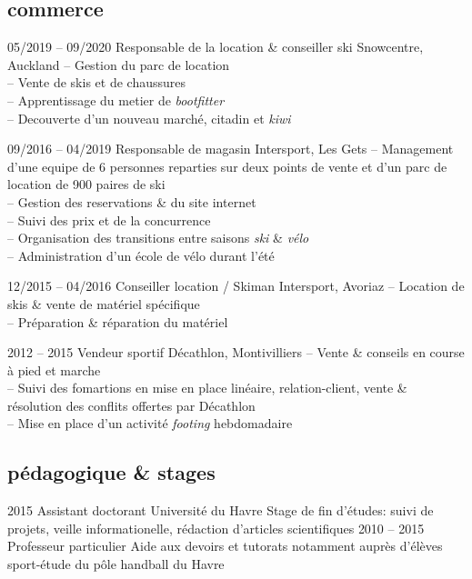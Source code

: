 \documentclass[]{farangoth-cv}
\begin{document}
\subsection{commerce}
\begin{entrylist}
  \entry%
  {05/2019 \--- 09/2020}
  {Responsable de la location \& conseiller ski}
  {Snowcentre, \mbox{Auckland}}
  {
    \--- Gestion du parc de location\\
    \--- Vente de skis et de chaussures\\
    \--- Apprentissage du metier de \emph{bootfitter}\\
    \--- Decouverte d'un nouveau marché, citadin et \emph{kiwi}
  }
  
  \entry%
  {09/2016 \--- 04/2019}
  {Responsable de magasin}
  {Intersport, Les Gets}
  {
    \--- Management d'une equipe de 6 personnes reparties sur deux points de vente et d'un parc de location de 900 paires de ski\\
    \--- Gestion des reservations \& du site internet\\
    \--- Suivi des prix et de la concurrence\\
    \--- Organisation des transitions entre saisons \emph{ski} \& \emph{vélo}\\
    \--- Administration d'un école de vélo durant l'été
  }
  
  \entry%
  {12/2015 \--- 04/2016}
  {Conseiller location / Skiman}
  {Intersport, Avoriaz}
  {%
    \--- Location de skis \& vente de matériel spécifique\\
    \--- Préparation \& réparation du matériel
  }
  
  \entry%
  {2012 \--- 2015}
  {Vendeur sportif}
  {Décathlon, \mbox{Montivilliers}}
  {%
    \--- Vente \& conseils en course à pied et marche\\
    \--- Suivi des fomartions en mise en place linéaire, relation-client, vente \& résolution des conflits offertes par Décathlon\\
    \--- Mise en place d'un activité \emph{footing} hebdomadaire
  }
\end{entrylist}

\subsection{pédagogique \& stages}
\begin{entrylist}
  \entry%
  {2015}
  {Assistant doctorant}
  {Université du Havre}
  {%
    Stage de fin d'études: suivi de projets, veille informationelle, rédaction d'articles scientifiques
  }
  \entry%
  {2010 \--- 2015}
  {Professeur particulier}
  {}
  {%
    Aide aux devoirs et tutorats notamment auprès d'élèves sport-étude du pôle handball du Havre
  }
\end{entrylist}
\end{document}
